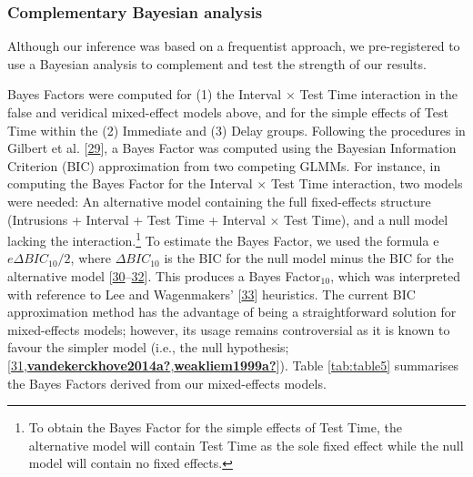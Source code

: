 \documentclass[
]{article}
\begin{document}
\hypertarget{complementary-bayesian-analysis}{%
\subsubsection{Complementary Bayesian analysis}\label{complementary-bayesian-analysis}}

Although our inference was based on a frequentist approach, we pre-registered to use a Bayesian analysis to complement and test the strength of our results.

Bayes Factors were computed for (1) the Interval \(\times\) Test Time interaction in the false and veridical mixed-effect models above, and for the simple effects of Test Time within the (2) Immediate and (3) Delay groups. Following the procedures in Gilbert et al. {[}\protect\hyperlink{ref-gilbert2018a}{29}{]}, a Bayes Factor was computed using the Bayesian Information Criterion (BIC) approximation from two competing GLMMs. For instance, in computing the Bayes Factor for the Interval \(\times\) Test Time interaction, two models were needed: An alternative model containing the full fixed-effects structure (Intrusions + Interval + Test Time + Interval \(\times\) Test Time), and a null model lacking the interaction.\footnote{To obtain the Bayes Factor for the simple effects of Test Time, the alternative model will contain Test Time as the sole fixed effect while the null model will contain no fixed effects.} To estimate the Bayes Factor, we used the formula e \(e{\Delta BIC_{10}/2}\), where \(\Delta BIC_{10}\) is the BIC for the null model minus the BIC for the alternative model {[}\protect\hyperlink{ref-masson2011a}{30}--\protect\hyperlink{ref-wagenmakers2007a}{32}{]}. This produces a Bayes Factor\(_{10}\), which was interpreted with reference to Lee and Wagenmakers' {[}\protect\hyperlink{ref-lee2014a}{33}{]} heuristics. The current BIC approximation method has the advantage of being a straightforward solution for mixed-effects models; however, its usage remains controversial as it is known to favour the simpler model (i.e., the null hypothesis; {[}\protect\hyperlink{ref-lindelov2018a}{31},\protect\hyperlink{ref-vandekerckhove2014a}{\textbf{vandekerckhove2014a?}},\protect\hyperlink{ref-weakliem1999a}{\textbf{weakliem1999a?}}{]}). Table \ref{tab:table5} summarises the Bayes Factors derived from our mixed-effects models.
\end{document}
